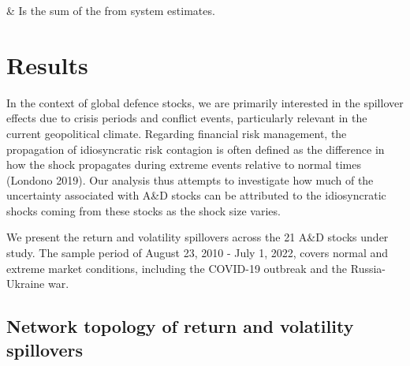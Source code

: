 \documentclass[
  letterpaper,
  DIV=11,
  numbers=noendperiod]{scrartcl}
\begin{document}
\begin{longtable}[]
                                                                                                                                                                                                                                                                                                                                                                                                                                                                                                                                                                                                                                                                                                                                                                                                                                                                                                                                                                                                                                                                                                                                                                                                                      \)
& Is the sum of the from system estimates. \\
\end{longtable}

\hypertarget{results}{%
\section{Results}\label{results}}

In the context of global defence stocks, we are primarily interested in
the spillover effects due to crisis periods and conflict events,
particularly relevant in the current geopolitical climate. Regarding
financial risk management, the propagation of idiosyncratic risk
contagion is often defined as the difference in how the shock propagates
during extreme events relative to normal times (Londono 2019). Our
analysis thus attempts to investigate how much of the uncertainty
associated with A\&D stocks can be attributed to the idiosyncratic
shocks coming from these stocks as the shock size varies.

We present the return and volatility spillovers across the 21 A\&D
stocks under study. The sample period of August 23, 2010 - July 1, 2022,
covers normal and extreme market conditions, including the COVID-19
outbreak and the Russia-Ukraine war.

\hypertarget{network-topology-of-return-and-volatility-spillovers}{%
\subsection{Network topology of return and volatility
spillovers}\label{network-topology-of-return-and-volatility-spillovers}}
\end{document}
